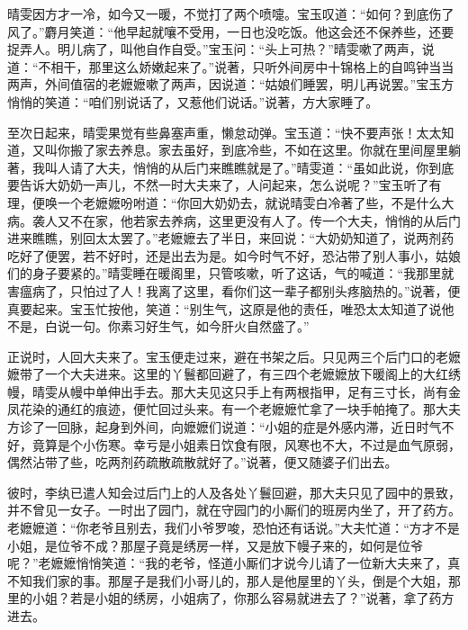 \begin{parag}


    晴雯因方才一冷，如今又一暖，不觉打了两个喷嚏。宝玉叹道：“如何？到底伤了风了。”麝月笑道：“他早起就嚷不受用，一日也没吃饭。他这会还不保养些，还要捉弄人。明儿病了，叫他自作自受。”宝玉问：“头上可热？”晴雯嗽了两声，说道：“不相干，那里这么娇嫩起来了。”说著，只听外间房中十锦格上的自鸣钟当当两声，外间值宿的老嬷嬷嗽了两声，因说道：“姑娘们睡罢，明儿再说罢。”宝玉方悄悄的笑道：“咱们别说话了，又惹他们说话。”说著，方大家睡了。
\end{parag}


\begin{parag}


    至次日起来，晴雯果觉有些鼻塞声重，懒怠动弹。宝玉道：“快不要声张！太太知道，又叫你搬了家去养息。家去虽好，到底冷些，不如在这里。你就在里间屋里躺著，我叫人请了大夫，悄悄的从后门来瞧瞧就是了。”晴雯道：“虽如此说，你到底要告诉大奶奶一声儿，不然一时大夫来了，人问起来，怎么说呢？”宝玉听了有理，便唤一个老嬷嬷吩咐道：“你回大奶奶去，就说晴雯白冷著了些，不是什么大病。袭人又不在家，他若家去养病，这里更没有人了。传一个大夫，悄悄的从后门进来瞧瞧，别回太太罢了。”老嬷嬷去了半日，来回说：“大奶奶知道了，说两剂药吃好了便罢，若不好时，还是出去为是。如今时气不好，恐沾带了别人事小，姑娘们的身子要紧的。”晴雯睡在暖阁里，只管咳嗽，听了这话，气的喊道：“我那里就害瘟病了，只怕过了人！我离了这里，看你们这一辈子都别头疼脑热的。”说著，便真要起来。宝玉忙按他，笑道：“别生气，这原是他的责任，唯恐太太知道了说他不是，白说一句。你素习好生气，如今肝火自然盛了。”
\end{parag}


\begin{parag}


    正说时，人回大夫来了。宝玉便走过来，避在书架之后。只见两三个后门口的老嬷嬷带了一个大夫进来。这里的丫鬟都回避了，有三四个老嬷嬷放下暖阁上的大红绣幔，晴雯从幔中单伸出手去。那大夫见这只手上有两根指甲，足有三寸长，尚有金凤花染的通红的痕迹，便忙回过头来。有一个老嬷嬷忙拿了一块手帕掩了。那大夫方诊了一回脉，起身到外间，向嬷嬷们说道：“小姐的症是外感内滞，近日时气不好，竟算是个小伤寒。幸亏是小姐素日饮食有限，风寒也不大，不过是血气原弱，偶然沾带了些，吃两剂药疏散疏散就好了。”说著，便又随婆子们出去。
\end{parag}


\begin{parag}


    彼时，李纨已遣人知会过后门上的人及各处丫鬟回避，那大夫只见了园中的景致，并不曾见一女子。一时出了园门，就在守园门的小厮们的班房内坐了，开了药方。老嬷嬷道：“你老爷且别去，我们小爷罗唆，恐怕还有话说。”大夫忙道：“方才不是小姐，是位爷不成？那屋子竟是绣房一样，又是放下幔子来的，如何是位爷呢？”老嬷嬷悄悄笑道：“我的老爷，怪道小厮们才说今儿请了一位新大夫来了，真不知我们家的事。那屋子是我们小哥儿的，那人是他屋里的丫头，倒是个大姐，那里的小姐？若是小姐的绣房，小姐病了，你那么容易就进去了？”说著，拿了药方进去。
\end{parag}


